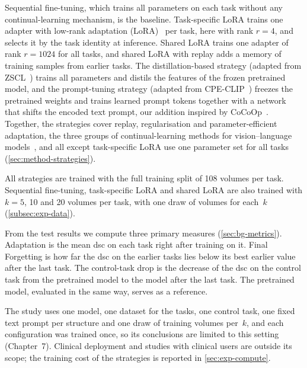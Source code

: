 Sequential fine-tuning, which trains all parameters on each task without any continual-learning mechanism, is the baseline.
Task-specific LoRA trains one adapter with low-rank adaptation (LoRA)~\cite{hu2022lora} per task, here with rank $r = 4$, and selects it by the task identity at inference.
Shared LoRA trains one adapter of rank $r = 1024$ for all tasks, and shared LoRA with replay adds a memory of training samples from earlier tasks.
The distillation-based strategy (adapted from ZSCL~\cite{zheng2023preventingzeroshottransferdegradation}) trains all parameters and distils the features of the frozen pretrained model, and the prompt-tuning strategy (adapted from CPE-CLIP~\cite{D_Alessandro_2023}) freezes the pretrained weights and trains learned prompt tokens together with a network that shifts the encoded text prompt, our addition inspired by CoCoOp~\cite{zhou2022cocoop}.
Together, the strategies cover replay, regularisation and parameter-efficient adaptation, the three groups of continual-learning methods for vision--language models~\cite[Sec.~4]{liu2026continuallearningvlmssurvey}, and all except task-specific LoRA use one parameter set for all tasks (\cref{sec:method-strategies}).

All strategies are trained with the full training split of 108 volumes per task.
Sequential fine-tuning, task-specific LoRA and shared LoRA are also trained with $k = 5$, 10 and 20 volumes per task, with one draw of volumes for each~$k$ (\cref{subsec:exp-data}).

From the test results we compute three primary measures (\cref{sec:bg-metrics}).
Adaptation is the mean \gls{dsc} on each task right after training on it.
Final Forgetting is how far the \gls{dsc} on the earlier tasks lies below its best earlier value after the last task.
The control-task drop is the decrease of the \gls{dsc} on the control task from the pretrained model to the model after the last task.
The pretrained model, evaluated in the same way, serves as a reference.

The study uses one model, one dataset for the tasks, one control task, one fixed text prompt per structure and one draw of training volumes per~$k$, and each configuration was trained once, so its conclusions are limited to this setting (Chapter~7).
Clinical deployment and studies with clinical users are outside its scope; the training cost of the strategies is reported in \cref{sec:exp-compute}.

